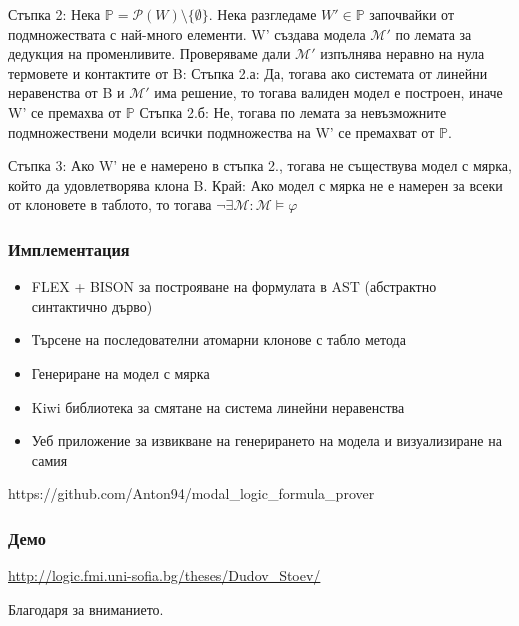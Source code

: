 \documentclass{beamer}
\begin{document}
\begin{frame}
Стъпка 2:
\newline
Нека $\mathbb{P} = \mathcal{P}(W) \setminus \{\emptyset\}$. Нека разгледаме $W' \in \mathbb{P}$ започвайки от подмножествата с най-много елементи.
			W' създава модела $\mathcal{M'}$ по лемата за дедукция на променливите.
			Проверяваме дали $\mathcal{M'}$ изпълнява неравно на нула термовете и контактите от B:
\newline
\newline
Стъпка 2.а:
\newline
 Да, тогава ако системата от линейни неравенства от B и $\mathcal{M'}$ има решение, то тогава валиден модел е построен, иначе W' се премахва от $\mathbb{P}$
\newline
\newline
Стъпка 2.б:
\newline
 Не, тогава по лемата за невъзможните подмножествени модели всички подмножества на W' се премахват от $\mathbb{P}$.
\end{frame}

\begin{frame}
Стъпка 3:
\newline
Ако W' не е намерено в стъпка 2., тогава не съществува модел с мярка, който да удовлетворява клона B.
\newline
\newline
Край:
\newline
Ако модел с мярка не е намерен за всеки от клоновете в таблото, то тогава $\neg \exists \mathcal{M}: \mathcal{M} \models \varphi$ 

\end{frame}

\begin{frame}\frametitle{Имплементация}
\begin{itemize}
	\item FLEX + BISON за построяване на формулата в AST (абстрактно синтактично дърво)
	\item Търсене на последователни атомарни клонове с табло метода
	\item Генериране на модел с мярка
	\item Kiwi библиотека за смятане на система линейни неравенства
	\item Уеб приложение за извикване на генерирането на модела и визуализиране на самия
\end{itemize}
 https://github.com/Anton94/modal\_logic\_formula\_prover
\end{frame}

\begin{frame}\frametitle{Демо}
\url{http://logic.fmi.uni-sofia.bg/theses/Dudov\_Stoev/}
\end{frame}

\begin{frame}
Благодаря за вниманието.
\end{frame}
\end{document}
